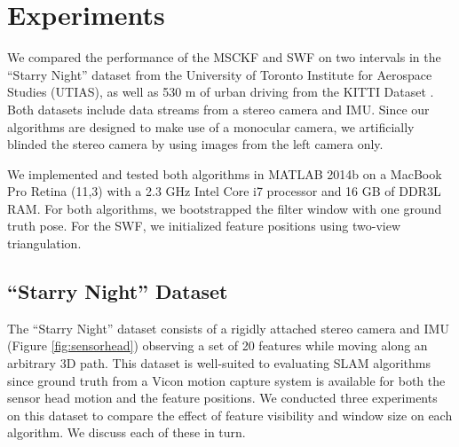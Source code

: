 \documentclass[letterpaper, 10 pt, conference]{ieeeconf}  %
\begin{document}
\section{Experiments} \label{sec:experiments}
We compared the performance of the MSCKF and SWF on two intervals in the ``Starry Night'' dataset from the University of Toronto Institute for Aerospace Studies (UTIAS), as well as 530 m of urban driving from the KITTI Dataset \cite{Geiger:2013:IJRR}.
Both datasets include data streams from a stereo camera and IMU.
Since our algorithms are designed to make use of a monocular camera, we artificially blinded the stereo camera by using images from the left camera only.

We implemented and tested both algorithms in MATLAB 2014b on a MacBook Pro Retina (11,3) with a 2.3 GHz Intel Core i7 processor and 16 GB of DDR3L RAM.
For both algorithms, we bootstrapped the filter window with one ground truth pose.
For the SWF, we initialized feature positions using two-view triangulation.


\subsection{``Starry Night'' Dataset}
The ``Starry Night'' dataset consists of a rigidly attached stereo camera and IMU (Figure \ref{fig:sensorhead}) observing a set of 20 features while moving along an arbitrary 3D path.
This dataset is well-suited to evaluating SLAM algorithms since ground truth from a Vicon motion capture system is available for both the sensor head motion and the feature positions.
We conducted three experiments on this dataset to compare the effect of feature visibility and window size on each algorithm.
We discuss each of these in turn.
\end{document}
